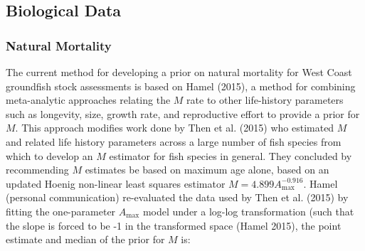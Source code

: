 \documentclass[11pt,
  english,
  a4paper,
]{article}
\begin{document}
\leavevmode\tagmcend\tagstructend\par


\hypertarget{biological-data}{%
\subsection{Biological Data}\label{biological-data}}

\leavevmode\tagmcend\tagstructend


\hypertarget{natural-mortality}{%
\subsubsection{Natural Mortality}\label{natural-mortality}}

\leavevmode\tagmcend\tagstructend


The current method for developing a prior on natural mortality for West Coast groundfish stock assessments is based on Hamel {(2015)\leavevmode\tagmcend\tagstructend}, a method for combining meta-analytic approaches relating the {\(M\)\leavevmode\tagmcend\tagstructend} rate to other life-history parameters such as longevity, size, growth rate, and reproductive effort to provide a prior for {\(M\)\leavevmode\tagmcend\tagstructend}. This approach modifies work done by Then et al. {(2015)\leavevmode\tagmcend\tagstructend} who estimated {\(M\)\leavevmode\tagmcend\tagstructend} and related life history parameters across a large number of fish species from which to develop an {\(M\)\leavevmode\tagmcend\tagstructend} estimator for fish species in general. They concluded by recommending {\(M\)\leavevmode\tagmcend\tagstructend} estimates be based on maximum age alone, based on an updated Hoenig non-linear least squares estimator {\(M = 4.899A^{-0.916}_{\text{max}}\)\leavevmode\tagmcend\tagstructend}. Hamel (personal communication) re-evaluated the data used by Then et al. {(2015)\leavevmode\tagmcend\tagstructend} by fitting the one-parameter {\(A_{\text{max}}\)\leavevmode\tagmcend\tagstructend} model under a log-log transformation (such that the slope is forced to be -1 in the transformed space {(Hamel 2015)\leavevmode\tagmcend\tagstructend}, the point estimate and median of the prior for {\(M\)\leavevmode\tagmcend\tagstructend} is:
\end{document}
